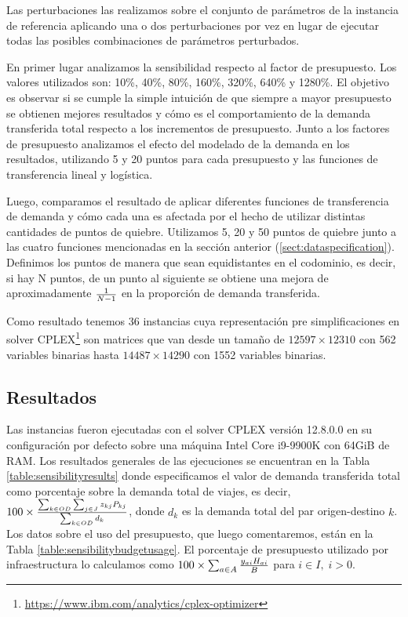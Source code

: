 Las perturbaciones las realizamos sobre el conjunto de parámetros de la instancia de referencia aplicando una o dos perturbaciones por vez en lugar de ejecutar todas las posibles combinaciones de parámetros perturbados.

En primer lugar analizamos la sensibilidad respecto al factor de presupuesto. Los valores utilizados son: 10\%, 40\%, 80\%, 160\%, 320\%, 640\% y 1280\%. El objetivo es observar si se cumple la simple intuición de que siempre a mayor presupuesto se obtienen mejores resultados y cómo es el comportamiento de la demanda transferida total respecto a los incrementos de presupuesto. Junto a los factores de presupuesto analizamos el efecto del modelado de la demanda en los resultados, utilizando 5 y 20 puntos para cada presupuesto y las funciones de transferencia lineal y logística.

Luego, comparamos el resultado de aplicar diferentes funciones de transferencia de demanda y cómo cada una es afectada por el hecho de utilizar distintas cantidades de puntos de quiebre. Utilizamos 5, 20 y 50 puntos de quiebre junto a las cuatro funciones mencionadas en la sección anterior (\ref{sect:dataspecification}). Definimos los puntos de manera que sean equidistantes en el codominio, es decir, si hay N puntos, de un punto al siguiente se obtiene una mejora de aproximadamente ${1 \over N - 1}$ en la proporción de demanda transferida.

Como resultado tenemos 36 instancias cuya representación pre simplificaciones en solver CPLEX\footnote{\url{https://www.ibm.com/analytics/cplex-optimizer}} son matrices que van desde un tamaño de $12597 \times 12310$ con 562 variables binarias hasta $14487 \times 14290$ con 1552 variables binarias.

\subsection{Resultados}

Las instancias fueron ejecutadas con el solver CPLEX versión 12.8.0.0 en su configuración por defecto sobre una máquina Intel Core i9-9900K con 64GiB de RAM. Los resultados generales de las ejecuciones se encuentran en la Tabla \ref{table:sensibilityresults} donde especificamos el valor de demanda transferida total como porcentaje sobre la demanda total de viajes, es decir, $100 \times {\sum_{k \in OD} \sum_{j \in J} z_{kj} P_{kj} \over \sum_{k \in OD} d_k}$, donde $d_k$ es la demanda total del par origen-destino $k$. Los datos sobre el uso del presupuesto, que luego comentaremos, están en la Tabla \ref{table:sensibilitybudgetusage}. El porcentaje de presupuesto utilizado por infraestructura lo calculamos como $100 \times \sum_{a \in A} {y_{ai} H_{ai} \over B}$ para $i \in I,\; i > 0$.

